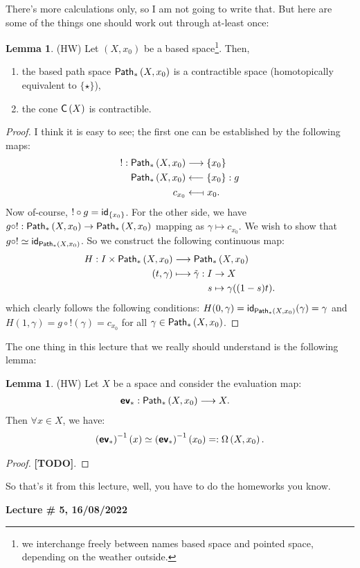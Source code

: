 \documentclass[letterpaper,11pt,twoside]{article}
\theoremstyle{definition}
\theoremstyle{definition}
\theoremstyle{definition}
\theoremstyle{definition}
\newtheorem{lemma}[proposition]{\textbf{Lemma}}
\theoremstyle{definition}
\theoremstyle{definition}
\theoremstyle{remark}
\theoremstyle{definition}
\newcommand{\newlecture}[2]{\begin{center}
    \textbf{Lecture \# #1, #2}
\end{center}}
\newcommand{\cone}[1]{{\fontfamily{lmss}\selectfont 
		\text{C}\left(#1\right)
}}
\newcommand{\id}[1]{{\fontfamily{lmss}\selectfont 
		\text{id}_{#1}
}}
\newcommand{\inv}[1]{\left(#1\right)^{-1}}
\newcommand{\pps}[1]{{\fontfamily{lmss}\selectfont 
		\text{Path}_{*}\left(#1\right)
}}
\newcommand{\ev}[0]{{\fontfamily{lmss}\selectfont 
        \textbf{ev}
}}
\newcommand{\loops}[1]{\Omega\left(#1\right)}
\begin{document}
	There's more calculations only, so I am not going to write that. But here are some of the things one should work out through at-least once:
	\begin{lemma}(HW)
	Let $(X,x_0)$ be a based space\footnote{we interchange freely between names based space and pointed space, depending on the weather outside.}. Then,
	\begin{enumerate}
	    \item {the based path space $\pps{X,x_0}$ is a contractible space (homotopically equivalent to $\{\star\}$),}
	    \item{the cone $\cone{X}$ is contractible.}
	\end{enumerate}
	\end{lemma}
	\begin{proof}
	I think it is easy to see; the first one can be established by the following maps:
	\begin{align*}
	    ! : \pps{X,x_0} &\longrightarrow \{x_0\}\\
	        \pps{X,x_0} &\longleftarrow \{x_0\} : g \\
	        c_{x_0} &\longleftarrow\!\shortmid x_0.
	\end{align*}
	Now of-course, $!\circ g = \id{\{x_0\}}$. For the other side, we have $g\circ ! : \pps{X,x_0} \to \pps{X,x_0}$ mapping as $\gamma \mapsto c_{x_0}$. We wish to show that $g\circ ! \simeq \id{\pps{X,x_0}}$. So we construct the following continuous map:
	\begin{align*}
	    H : I\times \pps{X,x_0} &\longrightarrow \pps{X,x_0}\\
	    (t,\gamma) &\longmapsto \tilde{\gamma} : I \to X\\
	               &\;\;\;\;\;\;\;\;\;\;\;\;\;s\mapsto \gamma((1-s)t).
	\end{align*}
	which clearly follows the following conditions:  $H(0,\gamma) = \id{\pps{X,x_0}}(\gamma) = \gamma$ and $H(1,\gamma) = g\circ !(\gamma) = c_{x_0}$ for all $\gamma \in \pps{X,x_0}$.
	\end{proof}
	The one thing in this lecture that we really should understand is the following lemma:
	\begin{lemma}
	(HW) Let $X$ be a space and consider the evaluation map:
	\begin{align*}
	    \ev_* : \pps{X,x_0} &\longrightarrow X.
	\end{align*}
	Then $\forall x\in X$, we have:
	\begin{align*}
	    \inv{\ev_*}(x) \simeq \inv{\ev_*}(x_0) =: \loops{X,x_0}.
	\end{align*}
	\end{lemma}
	\begin{proof}
	\textbf{[TODO]}.
	\end{proof}
	So that's it from this lecture, well, you have to do the homeworks you know.
	\newlecture{5}{16/08/2022}
\end{document}
